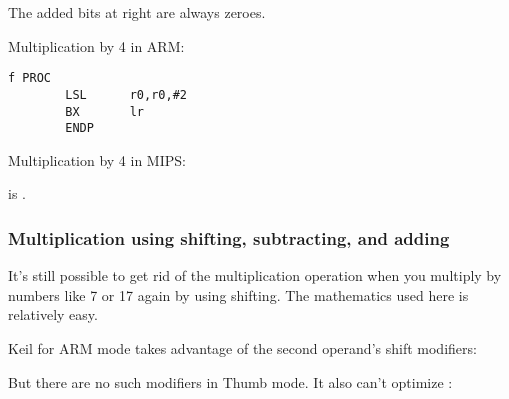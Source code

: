 The added bits at right are always zeroes.

Multiplication by 4 in ARM:

\begin{lstlisting}[caption=\NonOptimizingKeilVI (\ARMMode)]
f PROC
        LSL      r0,r0,#2
        BX       lr
        ENDP
\end{lstlisting}

Multiplication by 4 in MIPS:



 is .

\subsubsection{Multiplication using shifting, subtracting, and adding}
\label{multiplication_using_shifts_adds_subs}

It's still possible to get rid of the multiplication operation when you multiply by numbers like
7 or 17 again by using shifting.
The mathematics used here is relatively easy.








Keil for ARM mode takes advantage of the second operand's shift modifiers:



But there are no such modifiers in Thumb mode.
It also can't optimize :









